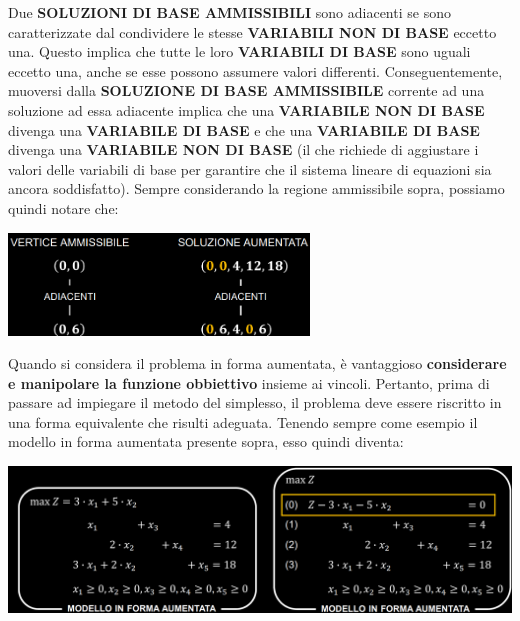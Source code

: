 \documentclass[12pt]{article}
\begin{document}
Due \textbf{SOLUZIONI DI BASE AMMISSIBILI} sono adiacenti se sono caratterizzate dal condividere le stesse \textbf{VARIABILI NON DI BASE} eccetto una. Questo implica che tutte le loro \textbf{VARIABILI DI BASE} sono uguali eccetto una, anche se esse possono assumere valori differenti.
Conseguentemente, muoversi dalla \textbf{SOLUZIONE DI BASE AMMISSIBILE} corrente ad una soluzione ad essa adiacente implica che una \textbf{VARIABILE NON DI BASE} divenga una \textbf{VARIABILE DI BASE} e che una \textbf{VARIABILE DI BASE} divenga una \textbf{VARIABILE NON DI BASE} (il che richiede di aggiustare i valori delle variabili di base per garantire che il sistema lineare di equazioni sia ancora soddisfatto).
Sempre considerando la regione ammissibile sopra, possiamo quindi notare che:
\begin{center}
    \includegraphics[width = 0.60\textwidth]{Images/22.png}
\end{center}
Quando si considera il problema in forma aumentata, è vantaggioso \textbf{considerare e manipolare la funzione obbiettivo} insieme ai vincoli.
Pertanto, prima di passare ad impiegare il metodo del simplesso, il problema deve essere riscritto in una forma equivalente che risulti adeguata.
Tenendo sempre come esempio il modello in forma aumentata presente sopra, esso quindi diventa:
\begin{center}
    \includegraphics[width = 1\textwidth]{Images/23.png}
\end{center}
\end{document}
